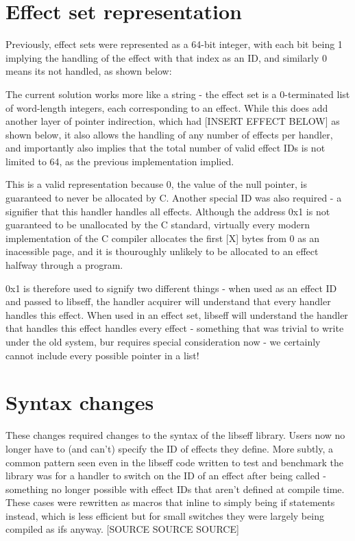 \documentclass[logo,bsc,singlespacing,parskip,online]{infthesis}
\begin{document}
\section{Effect set representation}

Previously, effect sets were represented as a 64-bit integer, with each bit being 1 implying the handling of the effect with that index as an ID, and similarly 0 means its not handled, as shown below: %

The current solution works more like a string - the effect set is a 0-terminated list of word-length integers, each corresponding to an effect. While this does add another layer of pointer indirection, which had [INSERT EFFECT BELOW] as shown below, it also allows the handling of any number of effects per handler, and importantly also implies that the total number of valid effect IDs is not limited to 64, as the previous implementation implied.

This is a valid representation because 0, the value of the null pointer, is guaranteed to never be allocated by C. Another special ID was also required - a signifier that this handler handles all effects. Although the address 0x1 is not guaranteed to be unallocated by the C standard, virtually every modern implementation of the C compiler allocates the first [X] bytes from 0 as an inacessible page, and it is thouroughly unlikely to be allocated to an effect halfway through a program.

0x1 is therefore used to signify two different things - when used as an effect ID and passed to libseff, the handler acquirer will understand that every handler handles this effect. When used in an effect set, libseff will understand the handler that handles this effect handles every effect - something that was trivial to write under the old system, bur requires special consideration now - we certainly cannot include every possible pointer in a list!

\section{Syntax changes}

These changes required changes to the syntax of the libseff library. Users now no longer have to (and can't) specify the ID of effects they define. More subtly, a common pattern seen even in the libseff code written to test and benchmark the library was for a handler to switch on the ID of an effect after being called - something no longer possible with effect IDs that aren't defined at compile time. These cases were rewritten as macros that inline to simply being if statements instead, which is less efficient but for small switches they were largely being compiled as ifs anyway. [SOURCE SOURCE SOURCE]
\end{document}
